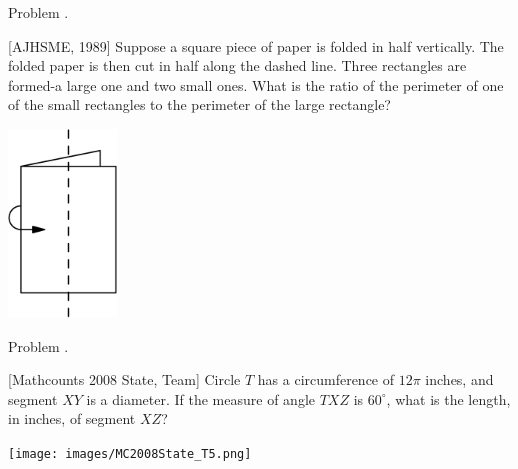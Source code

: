 \documentclass[9pt]{beamer}
\newcounter{problem}[section]
\begin{document}
\begin{frame}[t, fragile]{Problem \thesection.\theproblem}
    \begin{block}{}[AJHSME, 1989]
    Suppose a square piece of paper is folded in half vertically.  The folded paper is then cut in half along the dashed line.  Three rectangles are formed-a large one and two small ones.  What is the ratio of the perimeter of one of the small rectangles to the perimeter of the large rectangle?

	
    \end{block}
    \begin{center}
        \includegraphics[height=50mm,scale=0.01]{images/1989_AJHSME_24.png}
    \end{center}
\end{frame}

\begin{frame}[t, fragile]{Problem \thesection.\theproblem}
    \begin{block}{}[Mathcounts 2008 State, Team]
    Circle $T$ has a circumference of $12\pi$ inches, and segment $XY$ is a diameter. If the measure of angle $TXZ$ is $60^\circ$, what is the length, in inches, of segment $XZ$?

	
    \end{block}
    \begin{center}
        \texttt{[image: images/MC2008State\_T5.png]}
    \end{center}
\end{frame}
\end{document}
